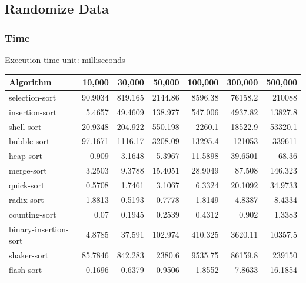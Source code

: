 \subsection{Randomize Data}
\subsubsection{Time}
Execution time unit: milliseconds

\begin{table}[h!]
\centering
\begin{tabular}{|l|r|r|r|r|r|r|}
\hline
\textbf{Algorithm} & \textbf{10,000} & \textbf{30,000} & \textbf{50,000} & \textbf{100,000} & \textbf{300,000} & \textbf{500,000} \\ \hline
selection-sort & 90.9034 & 819.165 & 2144.86 & 8596.38 & 76158.2 & 210088 \\ \hline
insertion-sort & 5.4657 & 49.4609 & 138.977 & 547.006 & 4937.82 & 13827.8 \\ \hline
shell-sort & 20.9348 & 204.922 & 550.198 & 2260.1 & 18522.9 & 53320.1 \\ \hline
bubble-sort & 97.1671 & 1116.17 & 3208.09 & 13295.4 & 121053 & 339611 \\ \hline
heap-sort & 0.909 & 3.1648 & 5.3967 & 11.5898 & 39.6501 & 68.36 \\ \hline
merge-sort & 3.2503 & 9.3788 & 15.4051 & 28.9049 & 87.508 & 146.323 \\ \hline
quick-sort & 0.5708 & 1.7461 & 3.1067 & 6.3324 & 20.1092 & 34.9733 \\ \hline
radix-sort & 1.8813 & 0.5193 & 0.7778 & 1.8149 & 4.8387 & 8.4334 \\ \hline
counting-sort & 0.07 & 0.1945 & 0.2539 & 0.4312 & 0.902 & 1.3383 \\ \hline
binary-insertion-sort & 4.8785 & 37.591 & 102.974 & 410.325 & 3620.11 & 10357.5 \\ \hline
shaker-sort & 85.7846 & 842.283 & 2380.6 & 9535.75 & 86159.8 & 239150 \\ \hline
flash-sort & 0.1696 & 0.6379 & 0.9506 & 1.8552 & 7.8633 & 16.1854 \\ \hline
\end{tabular}
\label{table:running_time}
\end{table}

